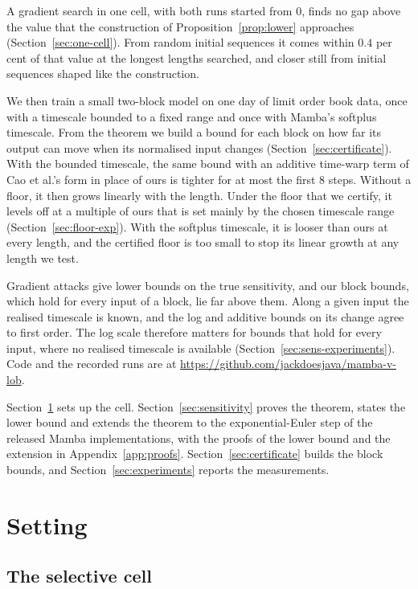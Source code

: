 \documentclass[11pt, a4paper]{article}
\theoremstyle{remark}
\theoremstyle{plain}
\begin{document}
A gradient search in one cell, with both runs started from $0$, finds no gap above the value that
the construction of Proposition~\ref{prop:lower} approaches (Section~\ref{sec:one-cell}). From
random initial sequences it comes within $0.4$ per cent of that value at the longest lengths
searched, and closer still from initial sequences shaped like the construction.

We then train a small two-block model on one day of limit order book data, once with a timescale
bounded to a fixed range and once with Mamba's softplus timescale. From the theorem we build a
bound for each block on how far its output can move when its normalised input changes
(Section~\ref{sec:certificate}). With the bounded timescale, the same bound with an additive
time-warp term of Cao et al.'s form in place of ours is tighter for at most the first $8$ steps.
Without a floor, it then grows linearly with the length. Under the floor that we certify, it
levels off at a multiple of ours that is set mainly by the chosen timescale range
(Section~\ref{sec:floor-exp}). With the softplus timescale, it is looser than ours at every
length, and the certified floor is too small to stop its linear growth at any length we test.

Gradient attacks give lower bounds on the true sensitivity, and our block bounds, which hold for
every input of a block, lie far above them. Along a given input the realised timescale is known,
and the log and additive bounds on its change agree to first order. The log scale therefore
matters for bounds that hold for every input, where no realised timescale is available
(Section~\ref{sec:sens-experiments}). Code and the recorded runs are at
\url{https://github.com/jackdoesjava/mamba-v-lob}.

Section~\ref{sec:setting} sets up the cell. Section~\ref{sec:sensitivity} proves the theorem,
states the lower bound and extends the theorem to the exponential-Euler step of the released Mamba
implementations, with the proofs of the lower bound and the extension in Appendix~\ref{app:proofs}.
Section~\ref{sec:certificate} builds the block bounds, and Section~\ref{sec:experiments} reports
the measurements.

\section{Setting}
\label{sec:setting}

\subsection{The selective cell}
\label{sec:block}
\end{document}
